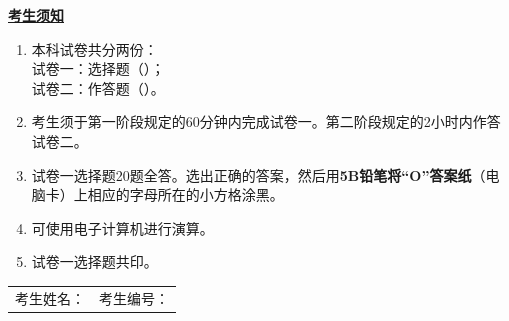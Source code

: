 \documentclass[12pt,a4paper]{exam-zh}
\begin{document}
    \vspace{2.0em}

    {\bfseries \underline{考生须知}\par}
    \vspace{0.8em}

    \begin{enumerate}[label=（\chinese*）,leftmargin=3em,itemsep=0.65em]
    \item 本科试卷共分两份：\\
    \hspace*{2em}试卷一：选择题（\paperonepercentage）；\\
    \hspace*{2em}试卷二：作答题（\papertwopercentage）。

    \item 考生须于第一阶段规定的60分钟内完成试卷一。第二阶段规定的2小时内作答试卷二。

    \item 试卷一选择题20题全答。选出正确的答案，然后用\textbf{5B铅笔将“O”答案纸}（电脑卡）上相应的字母所在的小方格涂黑。

    \item 可使用电子计算机进行演算。

    \item 试卷一选择题共印\questionpages。
    \end{enumerate}

    \vspace{2.0em}

    \begin{center}
    {%
    \setlength{\fboxrule}{3pt}%
    \setlength{\fboxsep}{1.5pt}%
    }
    \end{center}

    \vfill

    \begin{tabular*}{\linewidth}{@{\extracolsep{\fill}}ll}
    考生姓名：\underline{\hspace{4.2cm}} & 考生编号：\underline{\hspace{4.0cm}}
    \end{tabular*}

\end{document}

